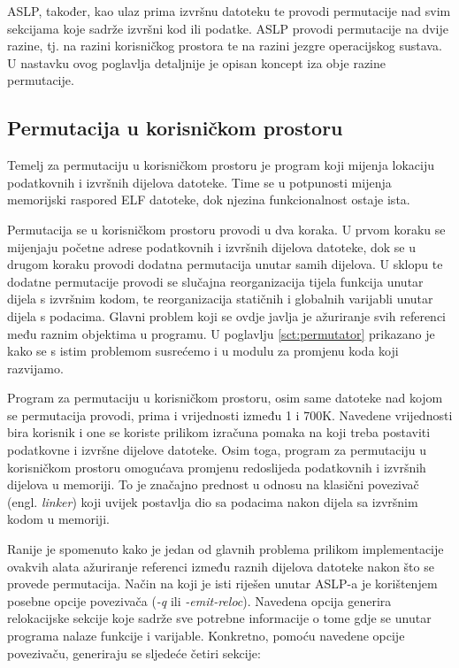 \documentclass[times, utf8, diplomski, numeric]{fer}
\begin{document}
ASLP, također, kao ulaz prima izvršnu datoteku te provodi
permutacije nad svim sekcijama koje sadrže izvršni kod ili
podatke. ASLP provodi permutacije na dvije razine, tj. na razini
korisničkog prostora te na razini jezgre operacijskog sustava. U
nastavku ovog poglavlja detaljnije je opisan koncept iza obje
razine permutacije.

\subsection{Permutacija u korisničkom prostoru}

Temelj za permutaciju u korisničkom prostoru je program koji
mijenja lokaciju podatkovnih i izvršnih dijelova datoteke. Time
se u potpunosti mijenja memorijski raspored ELF datoteke, dok
njezina funkcionalnost ostaje ista.

Permutacija se u korisničkom prostoru provodi u dva koraka. U
prvom koraku se mijenjaju početne adrese podatkovnih i izvršnih
dijelova datoteke, dok se u drugom koraku provodi dodatna
permutacija unutar samih dijelova. U sklopu te dodatne
permutacije provodi se slučajna reorganizacija tijela funkcija
unutar dijela s izvršnim kodom, te reorganizacija statičnih i
globalnih varijabli unutar dijela s podacima. Glavni problem koji
se ovdje javlja je ažuriranje svih referenci među raznim objektima u
programu. U poglavlju \ref{sct:permutator} prikazano je kako se s 
istim problemom susrećemo i u modulu za promjenu koda koji razvijamo.

Program za permutaciju u korisničkom prostoru, osim same datoteke
nad kojom se permutacija provodi, prima i vrijednosti između 1 i
700K. Navedene vrijednosti bira korisnik i one se koriste
prilikom izračuna pomaka na koji treba postaviti podatkovne i
izvršne dijelove datoteke. Osim toga, program za permutaciju u
korisničkom prostoru omogućava promjenu redoslijeda podatkovnih i
izvršnih dijelova u memoriji. To je značajno prednost u odnosu na
klasični povezivač (engl. \emph{linker}) koji uvijek postavlja dio
sa podacima nakon dijela sa izvršnim kodom u memoriji.

Ranije je spomenuto kako je jedan od glavnih problema prilikom
implementacije ovakvih alata ažuriranje referenci između raznih
dijelova datoteke nakon što se provede permutacija. Način na koji
je isti riješen unutar ASLP-a je korištenjem posebne opcije
povezivača (\emph{-q} ili \emph{-emit-reloc}). Navedena opcija
generira relokacijske sekcije koje sadrže sve potrebne
informacije o tome gdje se unutar programa nalaze funkcije i
varijable. Konkretno, pomoću navedene opcije povezivaču,
generiraju se sljedeće četiri sekcije:
\end{document}
